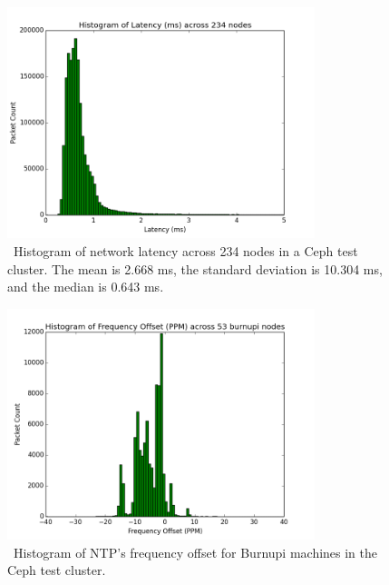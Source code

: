 \begin{figure}[!htbp]
  \centering
  \caption{~Histogram of network latency across 234 nodes in a Ceph test cluster. The mean is 2.668 ms, the 
  standard deviation is 10.304 ms, and the median is 0.643 ms.} 
  \label{fig:latency-hist}
  \includegraphics[width=0.8\textwidth]{latency-hist.png}
\end{figure}

\begin{figure}[!htbp]
  \centering
  \caption{~Histogram of NTP's frequency offset for Burnupi machines in the Ceph test cluster.}
  \label{fig:burnupi-hist}
  \includegraphics[width=0.8\textwidth]{burnupi-freq-offset.png}
\end{figure}

